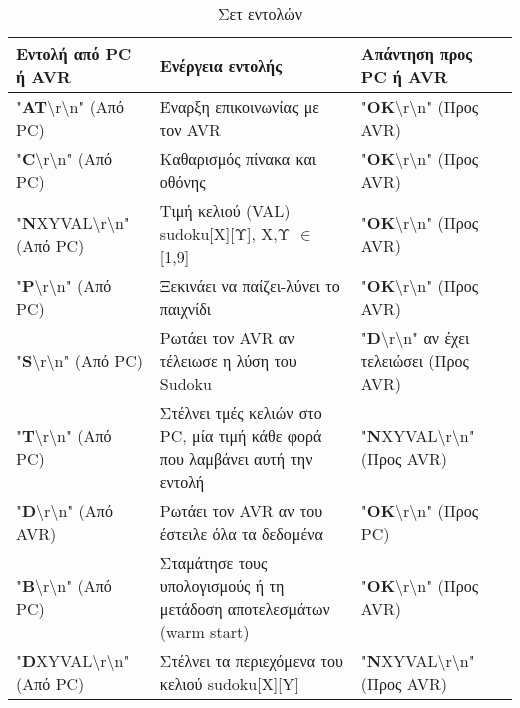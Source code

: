 \documentclass[a4paper,12pt]{article}
\begin{document}
\begin{table}[h!]
\centering
\begin{tabular}[c]{| p{} | p{} | p{} |}
\hline
\textbf{Εντολή από PC ή AVR} & \textbf{Ενέργεια εντολής} & \textbf{Απάντηση προς PC ή AVR} \\
\hline
"\textbf{AT}\textbackslash r\textbackslash n" (Από PC) & Έναρξη επικοινωνίας με τον AVR & "\textbf{OK}\textbackslash r\textbackslash n" (Προς AVR)\\
\hline
"\textbf{C}\textbackslash r\textbackslash n" (Από PC) & Καθαρισμός πίνακα και οθόνης  & "\textbf{OK}\textbackslash r\textbackslash n" (Προς AVR)\\
\hline
"\textbf{N}XYVAL\textbackslash r\textbackslash n" (Από PC) &  Τιμή κελιού (VAL) sudoku[Χ][Υ], Χ,Υ $\in$ [1,9] & "\textbf{OK}\textbackslash r\textbackslash n" (Προς AVR)\\
\hline
"\textbf{P}\textbackslash r\textbackslash n" (Από PC) & Ξεκινάει να παίζει-λύνει το παιχνίδι & "\textbf{OK}\textbackslash r\textbackslash n" (Προς AVR)\\
\hline
"\textbf{S}\textbackslash r\textbackslash n" (Από PC) & Ρωτάει τον AVR αν τέλειωσε η λύση του Sudoku  & "\textbf{D}\textbackslash r\textbackslash n" αν έχει τελειώσει (Προς AVR)\\
\hline
"\textbf{T}\textbackslash r\textbackslash n" (Από PC) & Στέλνει τμές κελιών στο PC, μία τιμή κάθε φορά που λαμβάνει αυτή την εντολή & "\textbf{N}XYVAL\textbackslash r\textbackslash n" (Προς AVR)\\
\hline
"\textbf{D}\textbackslash r\textbackslash n" (Από AVR) & Ρωτάει τον AVR αν του έστειλε όλα τα δεδομένα & "\textbf{OK}\textbackslash r\textbackslash n" (Προς PC)\\
\hline
"\textbf{B}\textbackslash r\textbackslash n" (Από PC) & Σταμάτησε τους υπολογισμούς ή τη μετάδοση αποτελεσμάτων (warm start) & "\textbf{OK}\textbackslash r\textbackslash n" (Προς AVR)\\
\hline
"\textbf{D}XYVAL\textbackslash r\textbackslash n" (Από PC) & Στέλνει τα περιεχόμενα του κελιού sudoku[X][Y] & "\textbf{N}XYVAL\textbackslash r\textbackslash n" (Προς AVR)\\
\hline
\end{tabular}
\renewcommand{\arraystretch}{1.2}
\caption{Σετ εντολών}
\label{table:commands}
\end{table}
\end{document}
